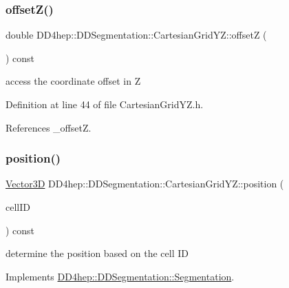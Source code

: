 \subsubsection{\texorpdfstring{offset\+Z()}{offsetZ()}}
{\footnotesize\ttfamily double D\+D4hep\+::\+D\+D\+Segmentation\+::\+Cartesian\+Grid\+Y\+Z\+::offsetZ (\begin{DoxyParamCaption}{ }\end{DoxyParamCaption}) const\hspace{0.3cm}{\ttfamily [inline]}}



access the coordinate offset in Z 



Definition at line 44 of file Cartesian\+Grid\+Y\+Z.\+h.



References \+\_\+offsetZ.

\hypertarget{class_d_d4hep_1_1_d_d_segmentation_1_1_cartesian_grid_y_z_a830b4d74e64bc4dabf7fc763176affd1}{}\label{class_d_d4hep_1_1_d_d_segmentation_1_1_cartesian_grid_y_z_a830b4d74e64bc4dabf7fc763176affd1} 
\subsubsection{\texorpdfstring{position()}{position()}}
{\footnotesize\ttfamily \hyperlink{struct_d_d4hep_1_1_d_d_segmentation_1_1_vector3_d}{Vector3D} D\+D4hep\+::\+D\+D\+Segmentation\+::\+Cartesian\+Grid\+Y\+Z\+::position (\begin{DoxyParamCaption}\item[{const \hyperlink{namespace_d_d4hep_1_1_d_d_segmentation_ac7af071d85cb48820914434a07e21ba1}{Cell\+ID} \&}]{cell\+ID }\end{DoxyParamCaption}) const\hspace{0.3cm}{\ttfamily [virtual]}}



determine the position based on the cell ID 



Implements \hyperlink{class_d_d4hep_1_1_d_d_segmentation_1_1_segmentation_a594fe6d78667415855858d083b64acad}{D\+D4hep\+::\+D\+D\+Segmentation\+::\+Segmentation}.



